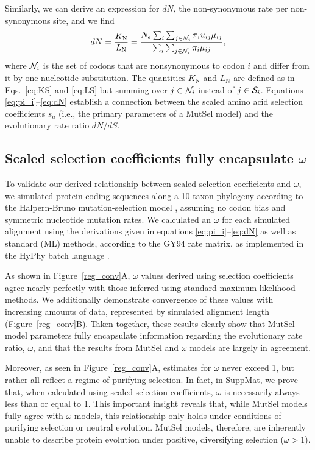 \documentclass[11pt]{article}
\begin{document}
Similarly, we can derive an expression for $dN$, the non-synonymous rate per non-synonymous site, and we find
\begin{equation}\label{eq:dN}
  dN = \frac{K_\text{N}}{L_\text{N}}=\frac{ N_e \sum_i \sum_{j \in {\cal N}_i} \pi_i u_{ij} \mu_{ij} } {\sum_i \sum_{j \in {\cal N}_i} \pi_i \mu_{ij} },
\end{equation}
where ${\cal N}_i$ is the set of codons that are nonsynonymous to codon $i$ and differ from it by one nucleotide substitution. The quantities $K_\text{N}$ and $L_\text{N}$ are defined as in Eqs.~\eqref{eq:KS} and \eqref{eq:LS} but summing over $j\in {\cal N}_i$ instead of $j\in {\cal S}_i$. Equations \eqref{eq:pi_i}--\eqref{eq:dN} establish a connection between the scaled amino acid selection coefficients $s_a$ (i.e., the primary parameters of a MutSel model) and the evolutionary rate ratio $dN/dS$. 


\subsection*{Scaled selection coefficients fully encapsulate $\omega$}

To validate our derived relationship between scaled selection coefficients and $\omega$, we simulated protein-coding sequences along a 10-taxon phylogeny according to the Halpern-Bruno mutation-selection model \cite{HalpernBruno1998}, assuming no codon bias and symmetric nucleotide mutation rates. We calculated an $\omega$ for each simulated alignment using the derivations given in equations \eqref{eq:pi_i}--\eqref{eq:dN} as well as standard (ML) methods, according to the GY94 \cite{GoldmanYang1994} rate matrix, as implemented in the HyPhy batch language \cite{KosakovskyPondetal2005}.

As shown in Figure~\ref{reg_conv}A, $\omega$ values derived using selection coefficients agree nearly perfectly with those inferred using standard maximum likelihood methods. We additionally demonstrate convergence of these values with increasing amounts of data, represented by simulated alignment length (Figure~\ref{reg_conv}B). Taken together, these results clearly show that MutSel model parameters fully encapsulate information regarding the evolutionary rate ratio, $\omega$, and that the results from MutSel and $\omega$ models are largely in agreement. 

Moreover, as seen in Figure~\ref{reg_conv}A, estimates for $\omega$ never exceed 1, but rather all reflect a regime of purifying selection. In fact, in SuppMat, we prove that, when calculated using scaled selection coefficients, $\omega$ is necessarily always less than or equal to 1. This important insight reveals that, while MutSel models fully agree with $\omega$ models, this relationship only holds under conditions of purifying selection or neutral evolution. MutSel models, therefore, are inherently unable to describe protein evolution under positive, diversifying selection ($\omega > 1$).
\end{document}
